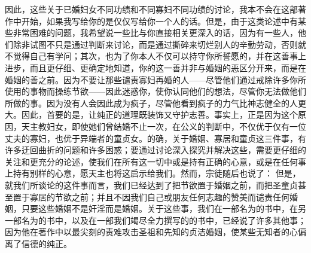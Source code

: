 因此，这些关于已婚妇女不同功绩和不同寡妇不同功绩的讨论，我本不会在这部著作中开始，如果我写给你的是仅仅写给你一个人的话。但是，由于这类论述中有某些非常困难的问题，我希望说一些比与你直接相关更深入的话，因为有一些人，他们除非试图不只是通过判断来讨论，而是通过撕碎来切烂别人的辛勤劳动，否则就不觉得自己有学问；其次，也为了你本人不仅可以持守你所誓愿的，并在这善事上进步，而且更仔细、更确定地知道，你的这一善并非与婚姻的恶区分开来，而是在婚姻的善之前。因为不要让那些谴责寡妇再婚的人——尽管他们通过戒除许多你所使用的事物而操练节欲——因此迷惑你，使你认同他们的想法，尽管你无法做他们所做的事。因为没有人会因此成为疯子，尽管他看到疯子的力气比神志健全的人更大。因此，首要的是，让纯正的道理既装饰又守护志善。事实上，正是因为这个原因，天主教妇女，即使她们曾结婚不止一次，在公义的判断中，不仅优于仅有一位丈夫的寡妇，也优于异端者的童贞女。的确，关于婚姻、寡居和童贞这三件事，有许多迂回曲折的问题和许多困惑；要通过讨论深入探究并解决这些，需要更仔细的关注和更充分的论述，使我们在所有这一切中或是持有正确的心意，或是在任何事上持有别样的心意，愿天主也将这启示给我们。然而，宗徒随后也说了： 但是，就我们所谈论的这件事而言，我们已经达到了把节欲置于婚姻之前，而把圣童贞甚至置于寡居的节欲之前；并且不因我们自己或朋友任何志趣的赞美而谴责任何婚姻，只要这些婚姻不是奸淫而是婚姻。关于这些事，我们在一部名为的书中，在另一部名为的书中，以及在一部我们竭尽全力撰写的的书中，已经说了许多其他事；因为他在著作中以最尖刻的责难攻击圣祖和先知的贞洁婚姻，使某些无知者的心偏离了信德的纯正。\par

